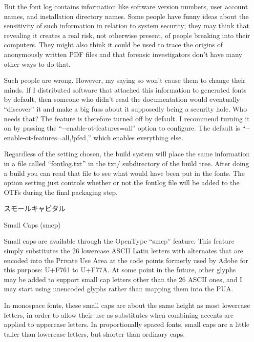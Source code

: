 \documentclass[14pt]{extarticle}
\newcommand{\blsubsection}[2]{%
\kaku\large#1\qquad\phantomsection%
\addcontentsline{toc}{subsection}{#1 #2}%
#2\par\addpenalty{-300}\normalsize}
\begin{document}
But the font log contains information like software version numbers, user
account names, and installation directory names.  Some people have funny
ideas about the sensitivity of such information in relation to system
security; they may think that revealing it creates a real risk, not
otherwise present, of people breaking into their computers.  They might also
think it could be used to trace the origins of anonymously written PDF files
and that forensic investigators don't have many other ways to do that.

Such people are wrong.  However, my saying so won't cause them to change
their minds.  If I distributed software that attached this information to
generated fonts by default, then someone who didn't read the documentation
would eventually ``discover'' it and make a big fuss about it supposedly
being a security hole.  Who needs that?  The feature is therefore turned off
by default.  I recommend turning it on by passing the
``-{}-enable-ot-features=all'' option to configure.  The default is
``-{}-enable-ot-features=all,!pfed,'' which enables everything else.

Regardless of the setting chosen, the build system will place the same
information in a file called ``fontlog.txt'' in the txt/ subdirectory of the
build tree.  After doing a build you can read that file to see what would
have been put in the fonts.  The option setting just controls whether or not
the fontlog file will be added to the OTFs during the final packaging step.


\blsubsection{スモールキャピタル}{Small Caps (smcp)}

{Small caps are available
through the OpenType ``smcp'' feature.}  This feature
simply substitutes the 26 lowercase ASCII Latin letters with alternates
that are encoded into the Private Use Area at the code points formerly used
by Adobe for this purpose:  U+F761 to U+F77A.  At some point in the future,
other glyphs may be added to support small cap letters other than the 26
ASCII ones, and I may start using unencoded glyphs rather than mapping them
into the PUA.

In monospace fonts, these small caps are about the same height as most
lowercase letters, in order to allow their use as substitutes when combining
accents are applied to uppercase letters.  In proportionally spaced fonts,
small caps are a little taller than lowercase letters, but shorter than
ordinary caps.
\end{document}
